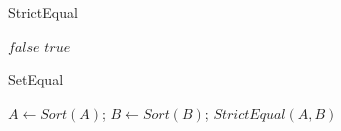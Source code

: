 \begin{algorithm}[htb]
    \centering
	\caption{StrictEqual}\label{StrictEqual}
	\begin{algorithmic}[1]
		\State \Return $false$
		\EndIf
		\EndFor
		\EndFor
		\State \Return $true$
		\EndFunction
	\end{algorithmic}
\end{algorithm}

\begin{algorithm}[htb]
    \centering
	\caption{SetEqual}\label{SetEqual}
	\begin{algorithmic}[1]
		\State $A \gets Sort(A)$;
		\State $B \gets Sort(B)$;
		\State \Return $StrictEqual(A,B)$
		\EndFunction
	\end{algorithmic}
\end{algorithm}

